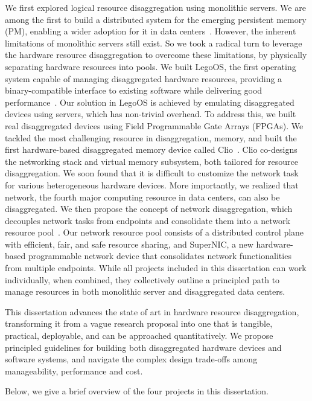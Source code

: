 We first explored logical resource disaggregation using monolithic servers.
We are among the first to build a distributed system for the emerging persistent memory (PM),
enabling a wider adoption for it in data centers~\cite{Shan17-SOCC}.
However, the inherent limitations of monolithic servers still exist.
So we took a radical turn to leverage the hardware resource disaggregation to overcome these limitations,
by physically separating hardware resources into pools.
We built LegoOS, the first operating system capable of managing disaggregated hardware resources,
providing a binary-compatible interface to existing software while delivering good performance~\cite{Shan18-OSDI}.
%
Our solution in LegoOS is achieved by emulating disaggregated devices using servers,
which has non-trivial overhead.
To address this, we built real disaggregated devices using Field Programmable Gate Arrays (FPGAs).
We tackled the most challenging resource in disaggregation, memory,
and built the first hardware-based disaggregated memory device called Clio~\cite{clio-arxiv}.
Clio co-designs the networking stack and virtual memory subsystem, both tailored for resource disaggregation.
%
We soon found that it is difficult to customize the 
network task for various heterogeneous hardware devices.
More importantly, we realized that network, the fourth major computing resource in data centers, can also be disaggregated.
We then propose the concept of network disaggregation,
which decouples network tasks from endpoints and consolidate them into a network resource pool~\cite{supernic-axiv}.
Our network resource pool consists of a distributed control plane with efficient, fair, and safe resource
sharing, and SuperNIC, a new hardware-based programmable network device that consolidates
network functionalities from multiple endpoints.
%
While all projects included in this dissertation can work individually, 
when combined, they collectively outline
a principled path to manage resources in both monolithic server and disaggregated data centers.

This dissertation advances the state of art in hardware resource disaggregation,
transforming it from a vague research proposal into
one that is tangible, practical, deployable, and can be approached quantitatively.
%
We propose principled guidelines for building both disaggregated hardware devices and software systems,
and navigate the complex design trade-offs among manageability, performance and cost.

Below, we give a brief overview of the four projects in this dissertation.

